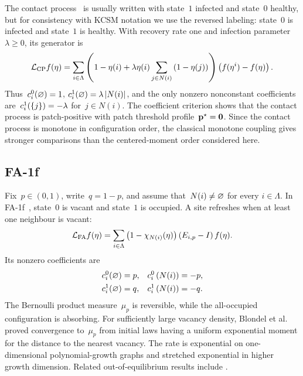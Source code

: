 \iffalse

\begin{remark}
\label{subsec:contact-benchmark}

The contact process~\cite{Harris1974} is usually written with state~$1$
infected and state~$0$ healthy, but for consistency with KCSM notation we use the reversed labeling: state~$0$ is
infected and state~$1$ is healthy. With recovery rate one and infection
parameter~$\lambda\geq0$, its generator is
\begin{equation*}
\mathcal{L}_{\mathrm{CP}}f(\eta)
=
\sum_{i\in\Lambda}
\left(
1-\eta(i)
+
\lambda\eta(i)\sum_{j\in N(i)}\left(1-\eta(j)\right)
\right)
\left(f(\eta^i)-f(\eta)\right).
\end{equation*}
Thus~$c_i^0(\varnothing)=1$, $c_i^1(\varnothing)=\lambda\left|N(i)\right|$, and the only nonzero
nonconstant coefficients are~$c_i^1(\left\{j\right\})=-\lambda$ for~$j\in N(i)$. The
coefficient criterion shows that the contact process is patch-positive with
patch threshold profile~$\mathbf{p}^\star=\mathbf{0}$. Since the contact process is
monotone in configuration order, the classical monotone coupling gives
stronger comparisons than the centered-moment order considered here.
\end{remark}

\subsection{FA-1f}
\label{subsec:fa-1f-applications}

Fix~$p\in(0,1)$, write~$q=1-p$, and assume that~$N(i)\neq\varnothing$ for every
$i\in\Lambda$. In FA-1f~\cite{FredricksonAndersen1984,CancriniEtAl2008,
HartarskyToninelli2025}, state~$0$ is vacant and state~$1$ is occupied. A site
refreshes when at least one neighbour is vacant:
\begin{equation*}
\mathcal{L}_{\mathrm{FA}}f(\eta)
=
\sum_{i\in\Lambda}
\left(1-\chi_{N(i)}(\eta)\right)
\left(E_{i,p}-I\right)f(\eta).
\end{equation*}
Its nonzero coefficients are
\begin{align*}
c_i^0(\varnothing)&=p,
&c_i^0\left(N(i)\right)&=-p,
\\
c_i^1(\varnothing)&=q,
&c_i^1\left(N(i)\right)&=-q.
\end{align*}
The Bernoulli product measure~$\mu_p$ is reversible, while the all-occupied
configuration is absorbing. For sufficiently large vacancy density,
Blondel et al.~\cite[Theorem~2.1 and Remarks~2.3--2.4]{BlondelEtAl2013}
proved convergence to~$\mu_p$ from initial laws having a uniform exponential
moment for the distance to the nearest vacancy. The rate is exponential on
one-dimensional polynomial-growth graphs and stretched exponential in higher
growth dimension. Related out-of-equilibrium results include
\cite{CancriniEtAl2010,MountfordValle2019,Mareche2019,
HartarskyToninelli2024}.

